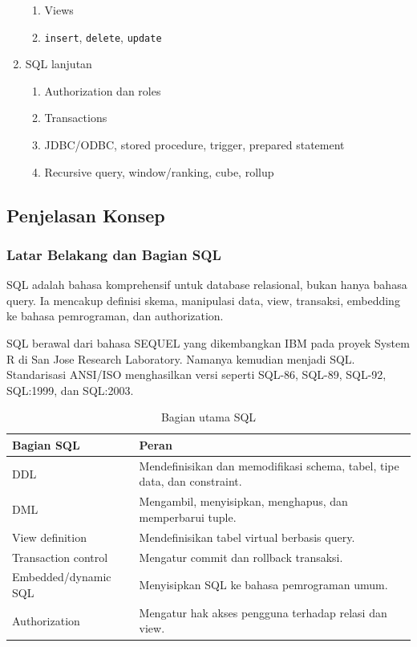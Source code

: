 \begin{enumerate}
\begin{enumerate}
        \item \pwajib Views
        \item \pwajib \texttt{insert}, \texttt{delete}, \texttt{update}
    \end{enumerate}
    \item \ppaham SQL lanjutan
    \begin{enumerate}
        \item \ppaham Authorization dan roles
        \item \ppaham Transactions
        \item \ppaham JDBC/ODBC, stored procedure, trigger, prepared statement
        \item \ppaham Recursive query, window/ranking, cube, rollup
    \end{enumerate}
\end{enumerate}

\subsection{Penjelasan Konsep}

\subsubsection{Latar Belakang dan Bagian SQL}

\begin{jawab}
SQL adalah bahasa komprehensif untuk database relasional, bukan hanya bahasa query. Ia mencakup definisi skema, manipulasi data, view, transaksi, embedding ke bahasa pemrograman, dan authorization.
\end{jawab}

SQL berawal dari bahasa SEQUEL yang dikembangkan IBM pada proyek System R di San Jose Research Laboratory. Namanya kemudian menjadi SQL. Standarisasi ANSI/ISO menghasilkan versi seperti SQL-86, SQL-89, SQL-92, SQL:1999, dan SQL:2003.

\begin{table}[H]
\centering
\begin{tabularx}{\textwidth}{|L{0.25\textwidth}|X|}
\hline
\textbf{Bagian SQL} & \textbf{Peran} \\
\hline
DDL & Mendefinisikan dan memodifikasi schema, tabel, tipe data, dan constraint. \\
\hline
DML & Mengambil, menyisipkan, menghapus, dan memperbarui tuple. \\
\hline
View definition & Mendefinisikan tabel virtual berbasis query. \\
\hline
Transaction control & Mengatur commit dan rollback transaksi. \\
\hline
Embedded/dynamic SQL & Menyisipkan SQL ke bahasa pemrograman umum. \\
\hline
Authorization & Mengatur hak akses pengguna terhadap relasi dan view. \\
\hline
\end{tabularx}
\caption{Bagian utama SQL}
\label{tab:sql-parts}
\end{table}

